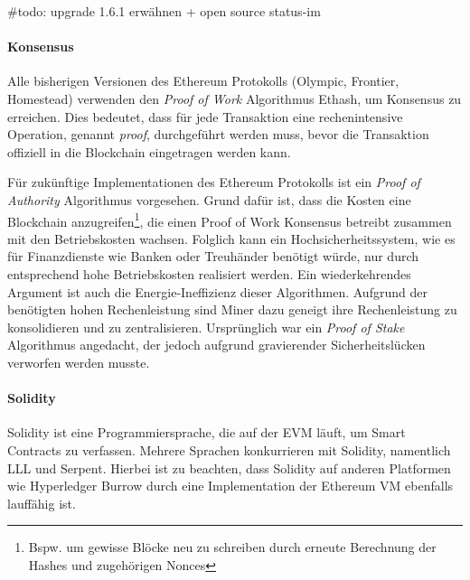 \#todo: upgrade 1.6.1 erwähnen + open source status-im

\paragraph{Konsensus}
Alle bisherigen Versionen des Ethereum Protokolls (Olympic, Frontier, Homestead) verwenden den \emph{Proof of Work} Algorithmus Ethash, um Konsensus zu erreichen. Dies bedeutet, dass für jede Transaktion eine rechenintensive Operation, genannt \emph{proof}, durchgeführt werden muss, bevor die Transaktion offiziell in die Blockchain eingetragen werden kann.\cite{Ethash}

Für zukünftige Implementationen des Ethereum Protokolls ist ein \emph{Proof of Authority} Algorithmus vorgesehen.\cite{github.com/ethereum_poa} Grund dafür ist, dass die Kosten eine Blockchain anzugreifen\footnote{Bspw. um gewisse Blöcke neu zu schreiben durch erneute Berechnung der Hashes und zugehörigen Nonces}, die einen Proof of Work Konsensus betreibt zusammen mit den Betriebskosten wachsen.\cite{coinmanual.com/pos, bitcoin.it/pos} Folglich kann ein Hochsicherheitssystem, wie es für Finanzdienste wie Banken oder Treuhänder benötigt würde, nur durch entsprechend hohe Betriebskosten realisiert werden. Ein wiederkehrendes Argument ist auch die Energie-Ineffizienz dieser Algorithmen. Aufgrund der benötigten hohen Rechenleistung sind Miner dazu geneigt ihre Rechenleistung zu konsolidieren und zu zentralisieren. Ursprünglich war ein \emph{Proof of Stake} Algorithmus angedacht\cite[{Frequently Asked Questions/What’s the future of Ethereum?}]{ethereum-homestead.readthedocs.io}, der jedoch aufgrund gravierender Sicherheitslücken verworfen werden musste.\cite{cost_nothing_kill_pos}

\paragraph{Solidity}
Solidity ist eine Programmiersprache, die auf der \acrfull{EVM} läuft, um Smart Contracts zu verfassen. Mehrere Sprachen konkurrieren mit Solidity, namentlich LLL und Serpent. Hierbei ist zu beachten, dass Solidity auf anderen Platformen wie Hyperledger Burrow durch eine Implementation der Ethereum VM ebenfalls lauffähig ist.\cite{github.com/hyperledger/burrow}

